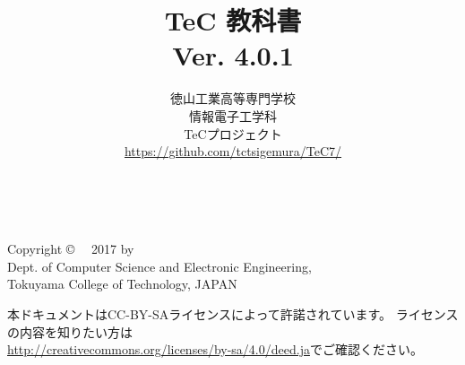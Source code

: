 \documentclass[a4paper,twocolumn,twoside,dvipdfmx]{jsbook}
\begin{document}
\frontmatter
\title{TeC 教科書\\Ver. 4.0.1}
\author{徳山工業高等専門学校\\情報電子工学科\\TeCプロジェクト\\
\url{https://github.com/tctsigemura/TeC7/}}
\date{}

\maketitle

\thispagestyle{empty}
\onecolumn
~
\vfill
\begin{flushleft}
Copyright \copyright ~~ 2017 by \\
Dept. of Computer Science and Electronic Engineering, \\
Tokuyama College of Technology, JAPAN
\end{flushleft}

\vspace{0.8cm}
本ドキュメントはCC-BY-SAライセンスによって許諾されています。
ライセンスの内容を知りたい方は\\
\url{http://creativecommons.org/licenses/by-sa/4.0/deed.ja}でご確認ください。

\setcounter{tocdepth}{2}
\tableofcontents

\twocolumn
\mainmatter

\appendix

\backmatter
\pagestyle{empty}
\onecolumn
~
\vfill\vfill\vfill
\begin{center}
\end{center}
\vfill
\end{document}
